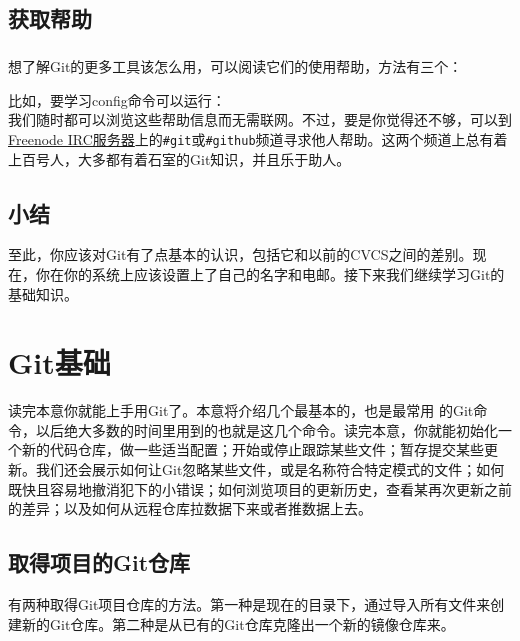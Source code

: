 \documentclass{book}
\begin{document}
	\section{获取帮助}
	\paragraph{}
	想了解Git的更多工具该怎么用，可以阅读它们的使用帮助，方法有三个：\\
	\begin{enumerate}
		\item \textbf{\verb|$ git help <verb> | \\
		\item \textbf{\verb|$ git <verb> --help | \\
		\item \textbf{\verb|$ man git-<verb> | \\
	\end{enumerate}
	比如，要学习config命令可以运行：\\
	我们随时都可以浏览这些帮助信息而无需联网。不过，要是你觉得还不够，可以到\href{irc.freenode.net}{Freenode IRC服务器}上的\verb|#git|或\verb|#github|频道寻求他人帮助。这两个频道上总有着上百号人，大多都有着石室的Git知识，并且乐于助人。\\
	\section{小结}
	至此，你应该对Git有了点基本的认识，包括它和以前的CVCS之间的差别。现在，你在你的系统上应该设置上了自己的名字和电邮。接下来我们继续学习Git的基础知识。

\chapter{Git基础}
	读完本意你就能上手用Git了。本意将介绍几个最基本的，也是最常用 的Git命令，以后绝大多数的时间里用到的也就是这几个命令。读完本意，你就能初始化一个新的代码仓库，做一些适当配置；开始或停止跟踪某些文件；暂存提交某些更新。我们还会展示如何让Git忽略某些文件，或是名称符合特定模式的文件；如何既快且容易地撤消犯下的小错误；如何浏览项目的更新历史，查看某再次更新之前的差异；以及如何从远程仓库拉数据下来或者推数据上去。\\
	\section{取得项目的Git仓库}
	有两种取得Git项目仓库的方法。第一种是现在的目录下，通过导入所有文件来创建新的Git仓库。第二种是从已有的Git仓库克隆出一个新的镜像仓库来。\\
\end{document}
